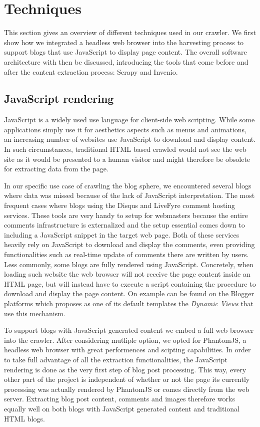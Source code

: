 \section{Techniques}

This section gives an overview of different techniques used in our crawler. We first show how we integrated a headless web browser into the harvesting process to support blogs that use JavaScript to display page content. The overall software architecture with then be discussed, introducing the tools that come before and after the content extraction process: Scrapy and Invenio.

\subsection{JavaScript rendering}
JavaScript is a widely used use language for client-side web scripting. While some applications simply use it for aesthetics aspects such as menus and animations, an increasing number of websites use JavaScript to download and display content. In such circumstances, traditional HTML based crawled would not see the web site as it would be presented to a human visitor and might therefore be obsolete for extracting data from the page.

In our specific use case of crawling the blog sphere, we encountered several blogs where data was missed because of the lack of JavaScript interpretation. The most frequent cases where blogs using the Disqus\cite{disqus2013} and LiveFyre\cite{livefyre2013} comment hosting services. These tools are very handy to setup for webmasters because the entire comments infrastructure is externalized and the setup essential comes down to including a JavaScript snippet in the target web page. Both of these services heavily rely on JavaScript to download and display the comments, even providing functionalities such as real-time update of comments there are written by users. Less commonly, some blogs are fully rendered using JavaScript. Concretely, when loading such website the web browser will not receive the page content inside an HTML page, but will instead have to execute a script containing the procedure to download and display the page content. On example can be found on the Blogger platforms which proposes as one of its default templates the \emph{Dynamic Views} \cite{antinharasymiv2011} that use this mechanism.

To support blogs with JavaScript generated content we embed a full web browser into the crawler. After considering mutliple option, we opted for PhantomJS\cite{phantomjs2013}, a headless web browser with great performences and scipting capabilities. In order to take full advantage of all the extraction functionalities, the JavaScript rendering is done as the very first step of blog post processing. This way, every other part of the project is independent of whether or not the page its currently processing was actually rendered by PhantomJS or comes directly from the web server. Extracting blog post content, comments and images therefore works equally well on both blogs with JavaScript generated content and traditional HTML blogs.


